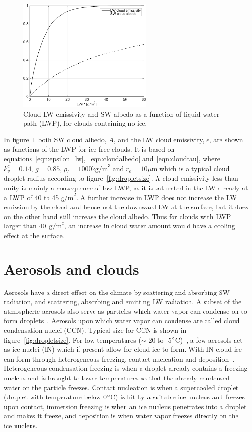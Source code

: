 \begin{figure}
\centering
\includegraphics[width=0.6\textwidth]{theory/eps_alb.pdf}
\caption{Cloud LW emissivity and SW albedo as a function of liquid water path (LWP), for clouds containing no ice.}
\label{fig:epsalb}
\end{figure}

In figure~\ref{fig:epsalb} both SW cloud albedo, $A$, and the LW cloud emissivity, $\epsilon$, are shown as functions of the LWP for ice-free clouds. It is based on equations~\ref{eqn:epsilon_lw},~\ref{eqn:cloudalbedo} and~\ref{eqn:cloudtau}, where $k_v^c=0.14$, $g=0.85$, $\rho_l=1000\text{kg/m}^3$ and $r_e = 10\mu\text{m}$ which is a typical cloud droplet radius according to figure~\ref{fig:dropletsize}. A cloud emissivity less than unity is mainly a consequence of low LWP, as it is saturated in the LW already at a LWP of 40 to 45 $\text{g/m}^2$. A further increase in LWP does not increase the LW emission by the cloud and hence not the downward LW at the surface, but it does on the other hand still increase the cloud albedo. Thus for clouds with LWP larger than 40~$\text{g/m}^2$, an increase in cloud water amount would have a cooling effect at the surface.


\section{Aerosols and clouds}
Aerosols have a direct effect on the climate by scattering and absorbing SW radiation, and scattering, absorbing and emitting LW radiation. A subset of the atmospheric aerosols also serve as particles which water vapor can condense on to form droplets~\citep{Wallace2006}. Aerosols upon which water vapor can condense are called cloud condensation nuclei (CCN). Typical size for CCN is shown in figure~\ref{fig:dropletsize}. For low temperatures ($\sim$-20 to -5$\degree$C)~\citep{Wallace2006}, a few aerosols act as ice nuclei (IN) which if present allow for cloud ice to form. With IN cloud ice can form through heterogeneous freezing, contact nucleation and deposition~\citep{Wallace2006}. Heterogeneous condensation freezing is when a droplet already contains a freezing nucleus and is brought to lower temperatures so that the already condensed water on the particle freezes. Contact nucleation is when a supercooled droplet (droplet with temperature below 0$\degree$C) is hit by a suitable ice nucleus and freezes upon contact, immersion freezing is when an ice nucleus penetrates into a droplet and makes it freeze, and deposition is when water vapor freezes directly on the ice nucleus.

